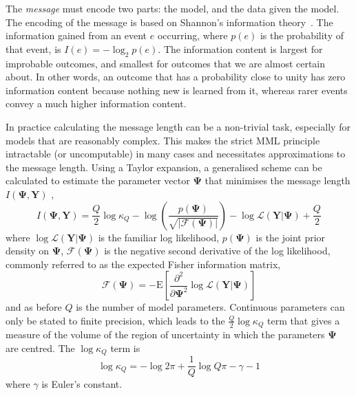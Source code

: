 \documentclass[twocolumn]{aastex62}
\newcommand{\vect}[1]{\boldsymbol{\mathbf{#1}}}
\renewcommand{\vec}[1]{\vect{#1}}
\newcommand{\data}{\textbf{Y}}
\newcommand{\vecdata}{\vec\data}
\newcommand{\likelihood}{\mathcal{L}}
\begin{document}
The \textit{message} must encode two parts: the model, and the data given the
model. The encoding of the message is based on Shannon's information theory~\citep{Shannon:1948}. 
The information gained from an event $e$ occurring, where $p(e)$ is the
probability of that event, is $I(e) = -\log_{2}{p(e)}$. The information content
is largest for improbable outcomes, and smallest for outcomes that we are 
almost certain about. In other words, an outcome that has a probability close
to unity has zero information content because nothing new is learned from it,
whereas rarer events convey a much higher information content. 





In practice calculating the message length can be a non-trivial task, 
especially for models that are reasonably complex. This makes the strict MML
principle intractable (or uncomputable) in many cases and necessitates
approximations to the message length. Using a Taylor expansion, a generalised
scheme can be calculated to estimate the parameter vector $\vec\Psi$ that
minimises the message length ${I}(\vec\Psi,\vecdata)$ \citep{Wallace:1987},
\begin{equation}
	{I}(\vec\Psi,\vecdata) = \frac{Q}{2}\log\kappa_Q - \log\left(\frac{p(\vec\Psi)}{\sqrt{|\mathcal{F}(\vec\Psi)|}}\right) - \log\mathcal{L}\left(\vecdata|\vec\Psi\right) + \frac{Q}{2} \label{eq:mml} 
\end{equation}
\noindent{}where $\log\likelihood(\vecdata|\vec\Psi)$ is the familiar
log likelihood, $p(\vec\Psi)$ is the joint prior density on $\vec\Psi$,
$\mathcal{F}(\vec\Psi)$ is the negative second derivative of the log likelihood,
commonly referred to as the expected Fisher information matrix,
\begin{equation}
	\mathcal{F}(\vec\Psi) = -\textrm{E}\left[\frac{\partial^2}{\partial\vec\Psi^2}\log\likelihood(\vecdata|\vec\Psi)\right]
\end{equation}
\noindent{}and as before $Q$ is the number of model parameters.
Continuous parameters can only be stated to finite precision, which leads
to the $\frac{Q}{2}\log\kappa_Q$ term that gives a measure of the volume of the region of
uncertainty in which the parameters $\vec\Psi$ are centred. The $\log\kappa_Q$
term is
\begin{equation}
	\log\kappa_Q = -\log{2\pi} + \frac{1}{Q}\log{Q\pi} - \gamma - 1
\end{equation}
\noindent{}where $\gamma$ is Euler's constant.
\end{document}
